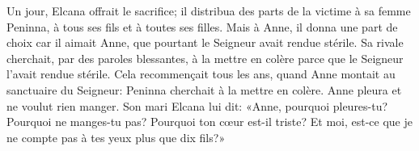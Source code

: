 Un jour, Elcana offrait le sacrifice;
	il distribua des parts de la victime à sa femme Peninna,
	à tous ses fils et à toutes ses filles.
Mais à Anne, il donna une part de choix
	car il aimait Anne, que pourtant le Seigneur avait rendue stérile.
Sa rivale cherchait, par des paroles blessantes, à la mettre en colère
	parce que le Seigneur l’avait rendue stérile.
Cela recommençait tous les ans, quand Anne montait au sanctuaire du Seigneur:
	Peninna cherchait à la mettre en colère.
	Anne pleura et ne voulut rien manger.
Son mari Elcana lui dit:
	«Anne, pourquoi pleures-tu? Pourquoi ne manges-tu pas?
	Pourquoi ton cœur est-il triste?
	Et moi, est-ce que je ne compte pas à tes yeux plus que dix fils?»
